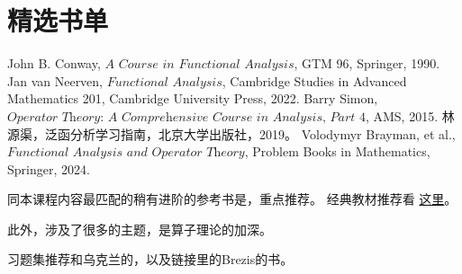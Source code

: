 \setcounter{section}{-1}
\section{精选书单}
\begin{references}
        John B. Conway, $\textit{A Course in Functional Analysis}$, 
        GTM 96, Springer, 1990.
        Jan van Neerven, $\textit{Functional Analysis}$,  
        Cambridge Studies in Advanced Mathematics 201, 
        Cambridge University Press, 2022.
        Barry Simon, $\textit{Operator Theory:
        A Comprehensive Course in Analysis, Part 4}$, AMS, 2015.
        林源渠，泛函分析学习指南，北京大学出版社，2019。
        Volodymyr Brayman, et al., $\textit{Functional Analysis and Operator Theory}$, 
        Problem Books in Mathematics, Springer, 2024.
\end{references}

\qquad 同本课程内容最匹配的稍有进阶的参考书是\cite{i}，重点推荐。
经典教材推荐看
\href{https://zhuanlan.zhihu.com/p/23978734?utm_medium=social&utm_oi=865280392050147328&from=timeline}
{这里}。

\qquad 此外，\cite{ii}涉及了很多的主题，\cite{iii}是算子理论的加深。

\qquad 习题集推荐\cite{iv}和乌克兰的\cite{v}，以及链接里的Brezis的书。


